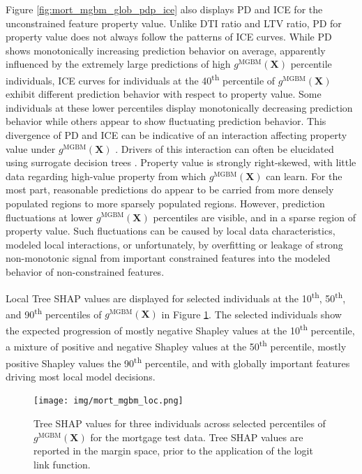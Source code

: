 \documentclass[information,article,submit,moreauthors,pdftex]{definitions/mdpi}
\begin{document}
{Figure \ref{fig:mort_mgbm_glob_pdp_ice} also displays PD and ICE for the unconstrained feature property value. Unlike DTI ratio and LTV ratio, PD for property value does not always follow the patterns of ICE curves. While PD shows monotonically increasing prediction behavior on average, apparently influenced by the extremely large predictions of high $g^{\text{MGBM}}(\mathbf{X})$ percentile individuals, ICE curves for individuals at the 40\textsuperscript{th} percentile of $g^{\text{MGBM}}(\mathbf{X})$ exhibit different prediction behavior with respect to property value. Some individuals at these lower percentiles display monotonically decreasing prediction behavior while others appear to show fluctuating prediction behavior. This divergence of PD and ICE can be indicative of an interaction affecting property value under $g^{\text{MGBM}}(\mathbf{X})$ \cite{ice_plots}. Drivers of this interaction can often be elucidated using surrogate decision trees \cite{art_and_sci}. Property value is strongly right-skewed, with little data regarding high-value property from which $g^{\text{MGBM}}(\mathbf{X})$ can learn. For the most part, reasonable predictions do appear to be carried from more densely populated regions to more sparsely populated regions. However, prediction fluctuations at lower $g^{\text{MGBM}}(\mathbf{X})$ percentiles are visible, and in a sparse region of property value. Such fluctuations can be caused by local data characteristics, modeled local interactions, or unfortunately, by overfitting or leakage of strong non-monotonic signal from important constrained features into the modeled behavior of non-constrained features. 

Local Tree SHAP values are displayed for selected individuals at the 10\textsuperscript{th}, 50\textsuperscript{th}, and 90\textsuperscript{th} percentiles of $g^{\text{MGBM}}(\mathbf{X})$ in Figure \ref{fig:mort_mgbm_loc}. The selected individuals show the expected progression of mostly negative Shapley values at the 10\textsuperscript{th} percentile, a mixture of positive and negative Shapley values at the 50\textsuperscript{th} percentile, mostly positive Shapley values the 90\textsuperscript{th} percentile, and with globally important features driving most local model decisions. 

\begin{figure}[H]
\centering
\texttt{[image: img/mort\_mgbm\_loc.png]}
\caption{Tree SHAP values for three individuals across selected percentiles of $g^\text{MGBM}(\mathbf{X})$ for the mortgage test data. Tree SHAP values are reported in the margin space, prior to the application of the logit link function.}
\label{fig:mort_mgbm_loc}
\end{figure}   

}
\end{document}
